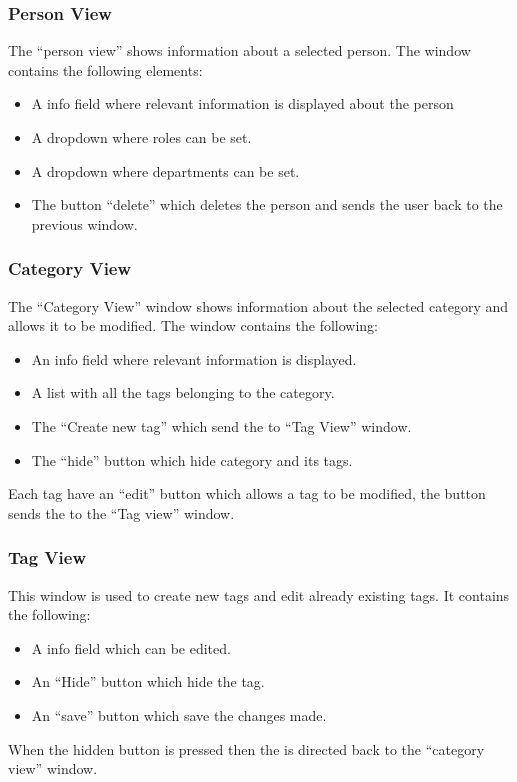 \subsubsection{Person View}
The ``person view'' shows information about a selected person.
The window contains the following elements:
\begin{itemize}
	\item A info field where relevant information is displayed about the person
	\item A dropdown where roles can be set.
	\item A dropdown where departments can be set.
	\item The button ``delete'' which deletes the person and sends the user back to the previous window. 
\end{itemize}

\subsubsection{Category View}
The ``Category View'' window shows information about the selected category and allows it to be modified. The window contains the following: 

\begin{itemize}
	\item An info field where relevant information is displayed.
	\item A list with all the tags belonging to the category.
	\item The ``Create new tag'' which send the \admin[] to ``Tag View'' window.
	\item The ``hide'' button which hide category and its tags. 
\end{itemize}
Each tag have an ``edit'' button which allows a tag to be modified, the button sends the \admin to the ``Tag view'' window. 

\subsubsection{Tag View}
This window is used to create new tags and edit already existing tags.
It contains the following:
\begin{itemize}
	\item A info field which can be edited.
	\item An ``Hide'' button which hide the tag.
	\item An ``save'' button which save the changes made.
\end{itemize}
When the hidden button is pressed then the \admin[] is directed back to the ``category view'' window.


